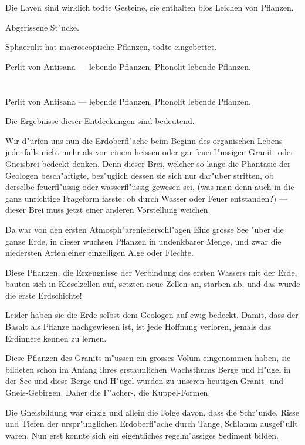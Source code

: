 \documentclass[a4paper, 11pt, oneside, german]{article}
\begin{document}
Die Laven sind wirklich todte Gesteine, sie enthalten blos Leichen von Pflanzen.

Abgerissene St"ucke.

Sphaerulit hat macroscopische Pflanzen, todte eingebettet.

Perlit von Antisana --- lebende Pflanzen. Phonolit lebende Pflanzen.
\clearpage
\section{}
\paragraph{}
Perlit von Antisana --- lebende Pflanzen. Phonolit lebende Pflanzen.

Die Ergebnisse dieser Entdeckungen sind bedeutend.

Wir d"urfen uns nun die Erdoberfl"ache beim Beginn des organischen Lebens jedenfalls nicht mehr als von einem heissen oder gar feuerfl"ussigen Granit- oder Gneisbrei bedeckt denken. Denn dieser Brei, welcher so lange die Phantasie der Geologen besch"aftigte, bez"uglich dessen sie sich nur dar"uber stritten, ob derselbe feuerfl"ussig oder wasserfl"ussig gewesen sei, (was man denn auch in die ganz unrichtige Frageform fasste: ob durch Wasser oder Feuer entstanden?) --- dieser Brei muss jetzt einer anderen Vorstellung weichen.

Da war von den ersten Atmosph"areniederschl"agen Eine grosse See "uber die ganze Erde, in dieser wuchsen Pflanzen in undenkbarer Menge, und zwar die niedersten Arten einer einzelligen Alge oder Flechte.

Diese Pflanzen, die Erzeugnisse der Verbindung des ersten Wassers mit der Erde, bauten sich in Kieselzellen auf, setzten neue Zellen an, starben ab, und das wurde die erste Erdschichte!

Leider haben sie die Erde selbst dem Geologen auf ewig bedeckt. Damit, dass der Basalt als Pflanze nachgewiesen ist, ist jede Hoffnung verloren, jemals das Erdinnere kennen zu lernen.

Diese Pflanzen des Granits m"ussen ein grosses Volum eingenommen haben, sie bildeten schon im Anfang ihres erstaunlichen Wachsthums Berge und H"ugel in der See und diese Berge und H"ugel wurden zu unseren heutigen Granit- und Gneis-Gebirgen. Daher die F"acher-, die Kuppel-Formen.

Die Gneisbildung war einzig und allein die Folge davon, dass die Schr"unde, Risse und Tiefen der urspr"unglichen Erdoberfl"ache durch Tange, Schlamm ausgef"ullt waren. Nun erst konnte sich ein eigentliches regelm"assiges Sediment bilden.
\end{document}
